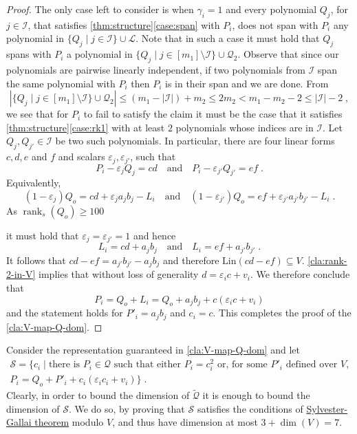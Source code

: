 \documentclass[10pt,a4paper]{article}
\def\rank{\operatorname{rank}}
\newcommand{\cI}{{\mathcal{I}}}
\newcommand{\calL}{{\mathcal{L}}}
\newcommand{\cQ}{{\mathcal{Q}}}
\newcommand{\calS}{{\mathcal{S}}}
\def\epsilon{\varepsilon}
\newcommand{\rkq}{100}
\newcommand{\MS}{\text{Lin}}
\begin{document}
\begin{proof}
The only case left to consider is when $\gamma_i =1$ and  every polynomial $Q_j$, for $j\in\cI$, that satisfies \autoref{thm:structure}\ref{case:span} with $P_i$, does not span with $P_i$ any polynomial in $\{Q_j \mid j\in  \cI\} \cup \calL$. Note that in such a case it must hold that $Q_j$ spans with $P_i$ a polynomial in $\{Q_j \mid j\in [m_1]\setminus  \cI\} \cup \cQ_2$. Observe that since our polynomials are pairwise linearly independent, if two polynomials from $\cI$ span the same polynomial with $P_i$ then $P_i$ is in their span and we are done. From 
$$\left|\{Q_j \mid j\in [m_1]\setminus  \cI\} \cup \cQ_2\right| \leq \left(m_1 - |\cI| \right) + m_2 \leq 2m_2 < m_1 -m_2 -2 \leq |\cI| -2 \;,$$
we see that for $P_i$ to fail to satisfy the claim it must be the case that 
it satisfies \autoref{thm:structure}\ref{case:rk1} with at least $2$ polynomials whose indices are in $\cI$. 
 Let $Q_j,Q_{j'} \in \cI$ be two such polynomials. In particular,  there are four linear forms $c,d,e$ and $f$ and scalars $\epsilon_j,\epsilon_{j'}$, such that
\begin{equation}\label{eq:P_i-twice-2}
P_i - \varepsilon_j Q_j = cd \quad \text{and} \quad P_i - \varepsilon_{j'} Q_{j'} = ef \;.
\end{equation} 
Equivalently, 
\begin{equation*}
(1- \varepsilon_j) Q_o = cd + \varepsilon_j a_jb_j - L_i  \quad \text{and} \quad (1- \varepsilon_{j'}) Q_o = ef + \varepsilon_{j'}a_{j'}b_{j'} - L_i \;.
\end{equation*} 
As $\rank_s(Q_o) \geq \rkq$ 

it must hold that $\varepsilon_j = \varepsilon_{j'} = 1$ and hence
\begin{equation*}
L_i = cd +   a_jb_j \quad \text{and} \quad 
L_i = ef + a_{j'}b_{j'} \;.
\end{equation*} 
It follows that  $cd -ef =   a_{j'}b_{j'}- a_{j}b_{j}$ and therefore $\MS(cd -ef) \subseteq V$. \autoref{cla:rank-2-in-V} implies that without loss of generality $d = \epsilon_i c + v_i$. We therefore conclude that $$P_i = Q_o + L_i = Q_o + a_jb_j + c( \epsilon_i c + v_i)$$ and the statement holds for $P'_i = a_jb_j$ and $c_i = c$.
This completes the proof of the \autoref{cla:V-map-Q-dom}.
\end{proof}

Consider the representation guaranteed in \autoref{cla:V-map-Q-dom} and let 
\[\begin{split}
\calS = \lbrace c_i \mid \text{there is } P_i\in\cQ \text{ such that either } P_i = c_i^2 \text{ or, for some } P'_i \text{ defined over } V, \\  P_i= Q_o +P'_i + c_i(\epsilon_i c_i + v_i)  \rbrace \;.
\end{split}\] 
Clearly, in order to bound the dimension of $\tilde{\cQ}$ it is enough to bound the dimension of $\calS$. We do so, by proving that $\calS$ satisfies the conditions of \hyperref[thm:SG-linforms]{Sylvester-Gallai theorem} modulo $V$, and thus have dimension at most $3+\dim(V)=7$.
\end{document}
